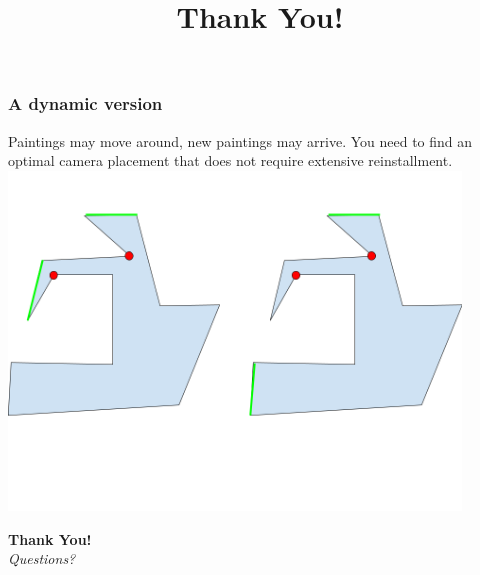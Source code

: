 \documentclass{beamer}
\begin{document}
\begin{frame}
    \frametitle{A dynamic version}
    Paintings may move around, new paintings may arrive. You need to find an optimal camera placement that does not require extensive reinstallment.\\\pause
    \centering
    \includegraphics[width=12cm]{figures/dynamic-gallery.png} %
\end{frame}





\begin{frame}
  \title{Thank You!}
  \begin{center}
      \Huge{\textbf{Thank You!}} \\
      \vspace{1em}
      \Large{\textit{Questions?}} \\
      \vspace{2em}
  \end{center}
\end{frame}
\end{document}
